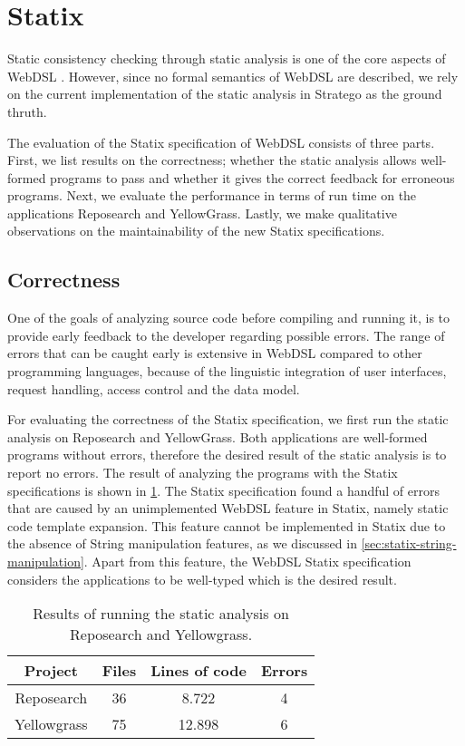 \section{\label{sec:eval-statix}Statix}

  Static consistency checking through static analysis is one of the core aspects of WebDSL \autocite{Hemel2011}. However, since no formal semantics of WebDSL are described, we rely on the current implementation of the static analysis in Stratego as the ground thruth.
  
  The evaluation of the Statix specification of WebDSL consists of three parts. First, we list results on the correctness; whether the static analysis allows well-formed programs to pass and whether it gives the correct feedback for erroneous programs. Next, we evaluate the performance in terms of run time on the applications Reposearch and YellowGrass. Lastly, we make qualitative observations on the maintainability of the new Statix specifications.

  \subsection{\label{subsec:eval-statix-correctness}Correctness}

    One of the goals of analyzing source code before compiling and running it, is to provide early feedback to the developer regarding possible errors. The range of errors that can be caught early is extensive in WebDSL compared to other programming languages, because of the linguistic integration of user interfaces, request handling, access control and the data model.

    For evaluating the correctness of the Statix specification, we first run the static analysis on Reposearch and YellowGrass. Both applications are well-formed programs without errors, therefore the desired result of the static analysis is to report no errors. The result of analyzing the programs with the Statix specifications is shown in \cref{tbl:statix-reposearch-yellowgrass-results}. The Statix specification found a handful of errors that are caused by an unimplemented WebDSL feature in Statix, namely static code template expansion. This feature cannot be implemented in Statix due to the absence of String manipulation features, as we discussed in \cref{sec:statix-string-manipulation}. Apart from this feature, the WebDSL Statix specification considers the applications to be well-typed which is the desired result.

    \begin{table}[h]
      \centering
      \begin{tabular}{ | c || c | c | c | }
        \hline
        Project & Files & Lines of code & Errors \\
        \hline
        Reposearch & 36 & 8.722 & 4 \\
        \hline
        Yellowgrass & 75 & 12.898 & 6 \\
        \hline
      \end{tabular}
      \caption{\label{tbl:statix-reposearch-yellowgrass-results}Results of running the static analysis on Reposearch and Yellowgrass.}
    \end{table}

